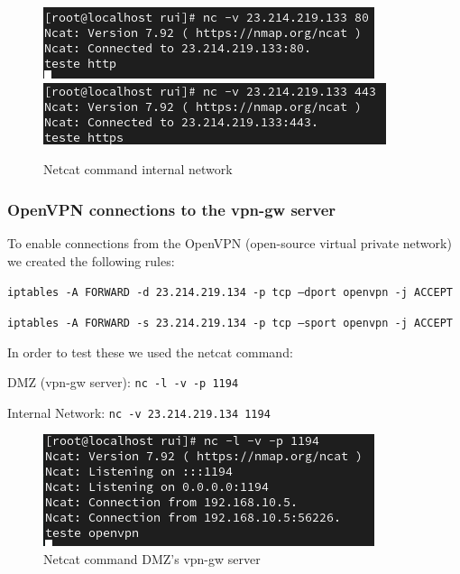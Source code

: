 \documentclass{article}
\begin{document}
\begin{figure}[H]
    \centering
    \includegraphics[scale=0.5]{btw/btw_http_internal.png}
    \includegraphics[scale=0.5]{btw/btw_https_internal.png}
    \caption{Netcat command internal network}
    \label{fig:network-arc}
\end{figure}


\subsubsection{OpenVPN connections to the vpn-gw server}

\texttt{}\par To enable connections from the OpenVPN (open-source virtual private network) we created the following rules:

\texttt{}\par
\texttt{iptables -A FORWARD -d 23.214.219.134 -p tcp --dport openvpn -j ACCEPT}\par
\texttt{iptables -A FORWARD -s 23.214.219.134 -p tcp --sport openvpn -j ACCEPT}\par
\texttt{}\par


In order to test these we used the netcat command:
\texttt{}\par
\texttt{}\par
DMZ (vpn-gw server): \texttt{nc -l -v -p 1194} \par
Internal Network: \texttt{nc -v 23.214.219.134 1194} \par
\texttt{}\par
\begin{figure}[H]
    \centering
    \includegraphics[scale=0.5]{btw/btw_openvpn_dmz.png}
    \caption{Netcat command DMZ's vpn-gw server}
    \label{fig:network-arc}
\end{figure}
\end{document}
